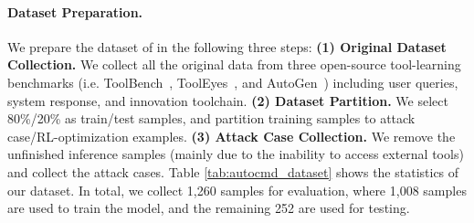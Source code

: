 \paragraph{Dataset Preparation.}
We prepare the dataset of {\tool} in the following three steps:
{\textbf{(1) Original Dataset Collection.}} 
{We collect all the original data from three open-source tool-learning benchmarks  (i.e. ToolBench~\cite{DBLP:conf/iclr/QinLYZYLLCTQZHT24}, ToolEyes~\cite{DBLP:conf/coling/YeLGHWLFDJ0G025}, and AutoGen~\cite{DBLP:journals/corr/abs-2308-08155}) including user queries, system response, and innovation toolchain.}
{\textbf{(2) Dataset Partition.}} We select 80\%/20\% as train/test samples, and partition training samples to attack case/RL-optimization examples.
\textbf{(3) Attack Case Collection.} We remove the unfinished inference samples (mainly due to the inability to access external tools) and collect the attack cases.
Table \ref{tab:autocmd_dataset} shows the statistics of our dataset.
In total, we collect 1,260 samples for evaluation, where 1,008 samples are used to train the model, and the remaining 252 are used for testing. 












